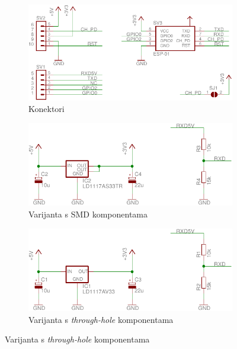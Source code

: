 \documentclass[times, utf8, zavrsni, numeric, sort]{fer}
\begin{document}
\begin{figure}[htb]
	\centering
	\begin{subfigure}[b]{8cm}
		\centering
		\includegraphics[width=\textwidth]{./Sklopovi/ESP8266/esp8266-adapter-sch-conn.pdf}
		\caption{Konektori}
		\label{fig:esp8266-konektori}
	\end{subfigure}
	\begin{subfigure}[b]{8cm}
		\centering
		\includegraphics[width=\textwidth]{./Sklopovi/ESP8266/esp8266-adapter-sch-smd.pdf}
		\caption{Varijanta s SMD komponentama}
		\label{fig:esp8266-SMD}
	\end{subfigure}
	\begin{subfigure}[b]{8cm}
		\centering
		\includegraphics[width=\textwidth]{./Sklopovi/ESP8266/esp8266-adapter-sch-th.pdf}
		\caption{Varijanta s \textit{through-hole} komponentama}
		\label{fig:esp8266-TH}
	\end{subfigure}
\end{figure}
\end{document}
